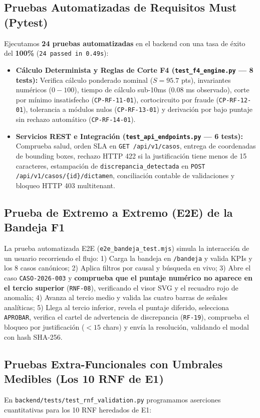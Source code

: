 \documentclass[11pt,letterpaper]{article}
\begin{document}
\subsection{Pruebas Automatizadas de Requisitos Must (Pytest)}
Ejecutamos \textbf{24 pruebas automatizadas} en el backend con una tasa de éxito del \textbf{100\%} (\texttt{24 passed in 0.49s}):
\begin{itemize}
    \item \textbf{Cálculo Determinista y Reglas de Corte F4 (\texttt{test\_f4\_engine.py} — 8 tests):}  
    Verifica cálculo ponderado nominal ($S = 95.7$ pts), invariantes numéricos ($0-100$), tiempo de cálculo sub-10ms (0.08 ms observado), corte por mínimo insatisfecho (\texttt{CP-RF-11-01}), cortocircuito por fraude (\texttt{CP-RF-12-01}), tolerancia a módulos nulos (\texttt{CP-RF-13-01}) y derivación por bajo puntaje sin rechazo automático (\texttt{CP-RF-14-01}).
    \item \textbf{Servicios REST e Integración (\texttt{test\_api\_endpoints.py} — 6 tests):}  
    Comprueba salud, orden SLA en \texttt{GET /api/v1/casos}, entrega de coordenadas de bounding boxes, rechazo HTTP 422 si la justificación tiene menos de 15 caracteres, estampación de \texttt{discrepancia\_detectada} en \texttt{POST /api/v1/casos/\{id\}/dictamen}, conciliación contable de validaciones y bloqueo HTTP 403 multitenant.
\end{itemize}

\subsection{Prueba de Extremo a Extremo (E2E) de la Bandeja F1}
La prueba automatizada E2E (\texttt{e2e\_bandeja\_test.mjs}) simula la interacción de un usuario recorriendo el flujo:
1) Carga la bandeja en \texttt{/bandeja} y valida KPIs y los 8 casos canónicos; 
2) Aplica filtros por causal y búsqueda en vivo; 
3) Abre el caso \texttt{CASO-2026-003} y \textbf{comprueba que el puntaje numérico no aparece en el tercio superior} (\texttt{RNF-08}), verificando el visor SVG y el recuadro rojo de anomalía; 
4) Avanza al tercio medio y valida las cuatro barras de señales analíticas; 
5) Llega al tercio inferior, revela el puntaje diferido, selecciona \texttt{APROBAR}, verifica el cartel de advertencia de discrepancia (\texttt{RF-19}), comprueba el bloqueo por justificación ($<15$ chars) y envía la resolución, validando el modal con hash SHA-256.

\subsection{Pruebas Extra-Funcionales con Umbrales Medibles (Los 10 RNF de E1)}
En \texttt{backend/tests/test\_rnf\_validation.py} programamos aserciones cuantitativas para los 10 RNF heredados de E1:
\end{document}
